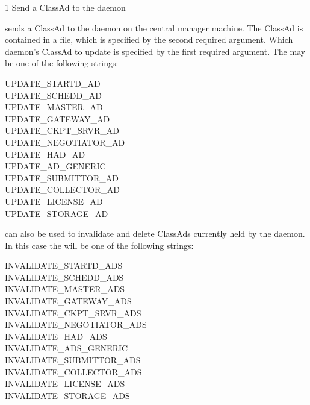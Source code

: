 \begin{ManPage}{\label{man-condor-advertise}}{1}
{Send a ClassAd to the  daemon}
\Synopsis {}
\ToolArgsBase
{}


\Description
{} sends a ClassAd to the  daemon on
the central manager machine.
The ClassAd is contained in a file,
which is specified by the second required argument.
Which daemon's ClassAd to update is specified by the first
required argument.
The  may be one of the following strings:
\begin{description}
\item[UPDATE\_STARTD\_AD]
\item[UPDATE\_SCHEDD\_AD]
\item[UPDATE\_MASTER\_AD]
\item[UPDATE\_GATEWAY\_AD]
\item[UPDATE\_CKPT\_SRVR\_AD]
\item[UPDATE\_NEGOTIATOR\_AD]
\item[UPDATE\_HAD\_AD]
\item[UPDATE\_AD\_GENERIC]
\item[UPDATE\_SUBMITTOR\_AD]
\item[UPDATE\_COLLECTOR\_AD]
\item[UPDATE\_LICENSE\_AD]
\item[UPDATE\_STORAGE\_AD]
\end{description}

 can also be used to invalidate and delete
ClassAds currently held by the  daemon.  In this case
the  will be one of the following strings:
\begin{description}
\item[INVALIDATE\_STARTD\_ADS]
\item[INVALIDATE\_SCHEDD\_ADS]
\item[INVALIDATE\_MASTER\_ADS]
\item[INVALIDATE\_GATEWAY\_ADS]
\item[INVALIDATE\_CKPT\_SRVR\_ADS]
\item[INVALIDATE\_NEGOTIATOR\_ADS]
\item[INVALIDATE\_HAD\_ADS]
\item[INVALIDATE\_ADS\_GENERIC]
\item[INVALIDATE\_SUBMITTOR\_ADS]
\item[INVALIDATE\_COLLECTOR\_ADS]
\item[INVALIDATE\_LICENSE\_ADS]
\item[INVALIDATE\_STORAGE\_ADS]
\end{description}


\end{ManPage}
